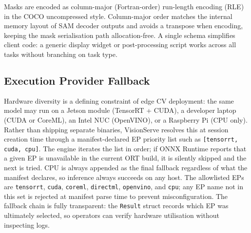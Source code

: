 Masks are encoded as column-major (Fortran-order) run-length encoding (RLE) in
the COCO uncompressed style.
Column-major order matches the internal memory layout of SAM decoder outputs
and avoids a transpose when encoding, keeping the mask serialisation path
allocation-free.
A single schema simplifies client code: a generic display widget or
post-processing script works across all tasks without branching on task type.

\subsection{Execution Provider Fallback}
\label{sec:design:ep}

Hardware diversity is a defining constraint of edge CV deployment: the same
model may run on a Jetson module (TensorRT + CUDA), a developer laptop (CUDA
or CoreML), an Intel NUC (OpenVINO), or a Raspberry Pi (CPU only).
Rather than shipping separate binaries, VisionServe resolves this at session
creation time through a manifest-declared EP priority list such as
\texttt{[tensorrt, cuda, cpu]}.
The engine iterates the list in order; if ONNX Runtime reports that a given EP
is unavailable in the current ORT build, it is silently skipped and the next
is tried.
CPU is always appended as the final fallback regardless of what the manifest
declares, so inference always succeeds on any host.
The allowlisted EPs are \texttt{tensorrt}, \texttt{cuda}, \texttt{coreml},
\texttt{directml}, \texttt{openvino}, and \texttt{cpu}; any EP name not in
this set is rejected at manifest parse time to prevent misconfiguration.
The fallback chain is fully transparent: the \texttt{Result} struct records
which EP was ultimately selected, so operators can verify hardware utilisation
without inspecting logs.
